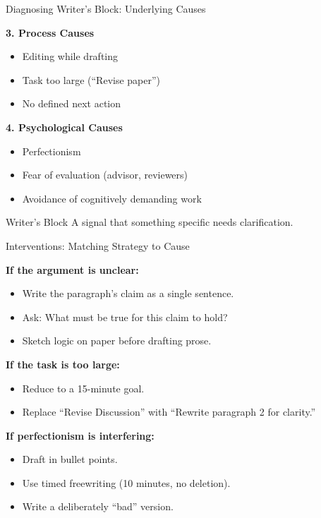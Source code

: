 \documentclass{beamer}
\begin{document}
\begin{frame}{Diagnosing Writer's Block: Underlying Causes}

\textbf{3. Process Causes}
\begin{itemize}
    \item Editing while drafting
    \item Task too large (“Revise paper”)
    \item No defined next action
\end{itemize}

\textbf{4. Psychological Causes}
\begin{itemize}
    \item Perfectionism
    \item Fear of evaluation (advisor, reviewers)
    \item Avoidance of cognitively demanding work
\end{itemize}

\vspace{0.5em}

\begin{block}{Writer's Block}
A signal that something specific needs clarification.
\end{block}

\end{frame}



\begin{frame}{Interventions: Matching Strategy to Cause}

\textbf{If the argument is unclear:}
\begin{itemize}
    \item Write the paragraph’s claim as a single sentence.
    \item Ask: What must be true for this claim to hold?
    \item Sketch logic on paper before drafting prose.
\end{itemize}

\textbf{If the task is too large:}
\begin{itemize}
    \item Reduce to a 15-minute goal.
    \item Replace “Revise Discussion” with
    “Rewrite paragraph 2 for clarity.”
\end{itemize}

\textbf{If perfectionism is interfering:}
\begin{itemize}
    \item Draft in bullet points.
    \item Use timed freewriting (10 minutes, no deletion).
    \item Write a deliberately “bad” version.
\end{itemize}


\end{frame}
\end{document}
